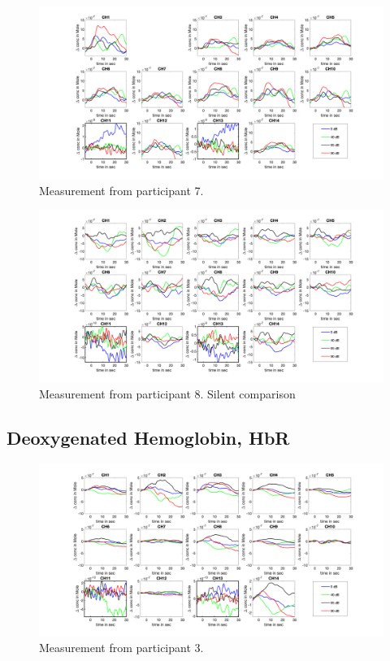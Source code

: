 \begin{figure}[H]
  \centering
    \includegraphics[scale=.4]{bilder/HbO_Mole/sub_liao_s_HbO.png}
  \caption{Measurement from participant 7.}
  \label{fig:somesignal}
\end{figure}


\begin{figure}[H]
  \centering
    \includegraphics[scale=.4]{bilder/HbO_Mole/sub_luca2_s_HbO.png}
  \caption{Measurement from participant 8. Silent comparison}
  \label{fig:somesignal}
\end{figure}



\newpage

\subsection{Deoxygenated Hemoglobin, HbR}

\begin{figure}[H]
  \centering
    \includegraphics[scale=.4]{bilder/HbR_Mole/sub_jonas_s_HbR.png}
  \caption{Measurement from participant 3.}
  \label{fig:somesignal}
\end{figure}

